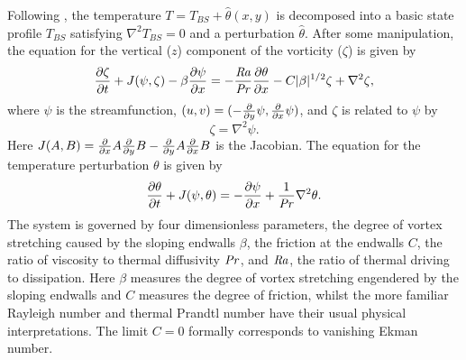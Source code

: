 \documentclass{jfm}
\newcommand{\laplacian}[1]{\nabla^2 #1}
\newcommand{\Rayleigh}{\mbox{\textit{Ra}}}  %
\begin{document}
Following \citet{bh1993, rj2006}, 
the temperature  $T = T_{BS} +{\hat \theta(x,y)}$ is decomposed into a basic state profile $T_{BS}$ satisfying $\nabla^2 T_{BS} = 0$ and a perturbation ${\hat \theta}$. 
After some manipulation, the equation for the vertical ($z$) component of the vorticity ($\zeta$) is given by
\begin{equation}
  \label{eq:zeta_eom}
  \pdv{\zeta}{t} + J(\psi, \zeta) - \beta \pdv{\psi}{x} = -\frac{\Rayleigh}{\Pran} \pdv{\theta}{x} -C |\beta|^{1/2} \zeta + \laplacian{\zeta},
\end{equation}
where $\psi$ is the streamfunction, $(u,v) = (-\pdv*{\psi}{y}, \pdv*{\psi}{x})$, and $\zeta$ is related to $\psi$ by
\begin{equation}
  \label{eq:zeta_def}
  \zeta = \laplacian{\psi}.
\end{equation}
Here $J(A, B) = \pdv*{A}{x}\pdv*{B}{y} - \pdv*{A}{y}\pdv*{B}{x}$ is the Jacobian. 
The equation for the temperature perturbation  $\theta$ is given by
%
\begin{equation}
  \label{eq:theta}
  \pdv{\theta}{t} + J(\psi, \theta) = -\pdv{\psi}{x} + \frac{1}{\mbox{\textit{Pr}}} \nabla^2 \theta.
\end{equation}
The system is governed by four dimensionless parameters, the degree of vortex stretching caused by the sloping endwalls $\beta$, the friction at the endwalls $C$, the ratio of viscosity to thermal diffusivity $\mbox{\textit{Pr}}$, and $\Rayleigh$, the ratio of thermal driving to dissipation. Here $\beta$ measures the degree of vortex stretching engendered by the sloping endwalls and $C$ measures the degree of friction, whilst the more familiar Rayleigh number and thermal Prandtl number have their usual physical interpretations.
The limit $C = 0$ formally corresponds to vanishing Ekman number.
\end{document}
